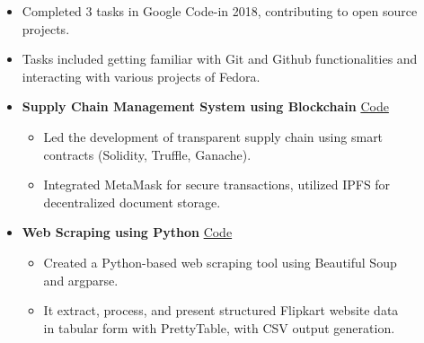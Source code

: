 \documentclass[10pt,a4paper,ragged2e,withhyper]{altacv}
\begin{document}
\begin{paracol}{2}
\divider

\begin{itemize}
\item Completed 3 tasks in Google Code-in 2018, contributing to open source projects.
\item Tasks included getting familiar with Git and Github functionalities and interacting with various projects of Fedora.
\end{itemize}


\divider



\begin{itemize}
    \item {\color{black} \normalsize \textbf{Supply Chain Management System using Blockchain}} \hfill {\color{accent} \faGithub \href{https://github.com/atharao/Supply-Chain-Management-using-Blockchain}{ \hspace{0.5mm}Code}}
    \begin{itemize}
        \item Led the development of transparent supply chain using smart \\contracts (Solidity, Truffle, Ganache). 
        \item Integrated MetaMask for secure transactions, utilized IPFS for\\ decentralized document storage.
    \end{itemize}

    \item {\color{black} \normalsize \textbf{Web Scraping using Python}} \hfill {\color{accent} \faGithub \href{https://github.com/atharao/Flipkart_Scraper}{ \hspace{0.5mm}Code}}
    \begin{itemize}
        \item Created a Python-based web scraping tool using Beautiful Soup \\and argparse.
        \item It extract, process, and present structured Flipkart website data \\in tabular form with PrettyTable, with CSV output generation.
    \end{itemize}


\end{itemize}
\end{paracol}
\end{document}
